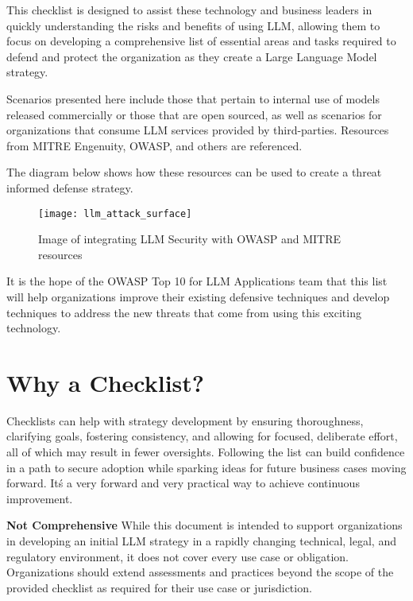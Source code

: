 This checklist is designed to assist these technology and business leaders in
quickly understanding the risks and benefits of using LLM, allowing them to
focus on developing a comprehensive list of essential areas and tasks required
to defend  and protect the organization as they create a Large Language Model
strategy.

Scenarios presented here include those that pertain to internal use of models
released commercially or those that are open sourced, as well as scenarios for
organizations that consume LLM services provided by third-parties. Resources
from MITRE Engenuity, OWASP, and others are referenced.

The diagram below shows how these resources can be used to create a threat
informed defense strategy.

\begin{figure}[h]
  \centering
  \texttt{[image: llm\_attack\_surface]}
  \caption{Image of integrating LLM Security with OWASP and MITRE resources}
  \label{fig:llm-attack-surface}
\end{figure}

It is the hope of the OWASP Top 10 for LLM Applications team that this list will
help organizations improve their existing defensive techniques and develop
techniques to address the new threats that come from using this exciting technology.

\clearpage
\section{Why a Checklist?}

Checklists can help with strategy development by ensuring thoroughness,
clarifying goals, fostering consistency, and allowing for focused, deliberate
effort, all of which may result in fewer oversights. Following the list can
build confidence in a path to secure adoption while sparking ideas for future
business cases moving forward. It\'s a very forward and very practical way to
achieve continuous improvement.

\textbf{Not Comprehensive}
While this document is intended to support organizations in developing an
initial LLM strategy in a rapidly changing technical, legal, and regulatory
environment, it does not cover every use case or obligation. Organizations
should extend assessments and practices beyond the scope of the provided
checklist as required for their use case or jurisdiction.
